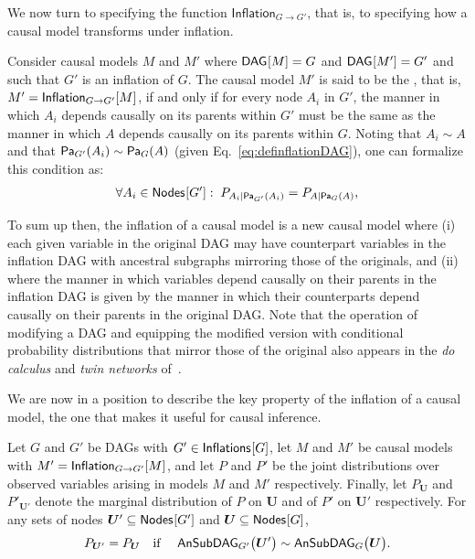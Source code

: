 We now turn to specifying the function $\mathsf{Inflation}_{G\to G'}$, that is, to specifying how a causal model transforms under inflation. 

\begin{definition}
Consider causal models $M$ and $M'$ where $\SmallNamedFunction{DAG}{M}=G$ and $\SmallNamedFunction{DAG}{M'}=G'$ and such that $G'$ is an inflation of $G$.   The causal model $M'$ is said to be the {\em {}}, that is, $M' = \SmallNamedFunction[G\to G']{Inflation}{M}$,  if and only if for every node $A_i$ in $G'$, the manner in which $A_i$ depends causally on its parents within $G'$ must be the same as the manner in which $A$ depends causally on its parents within $G$.  Noting that $A_i \sim A$ and that $\Pa[G']{A_i} \sim \Pa[G]{A}$ (given Eq.~\eqref{eq:definflationDAG}), one can formalize this condition as:
\begin{align}\label{eq:funcdependences}
 \forall A_i \in \SmallNamedFunction{Nodes}{G'}:\; \pfunc{A_i| \Pa[G']{A_i}}=\pfunc{A|\Pa[G]{A}},
\end{align}
\end{definition}

To sum up then, the inflation of a causal model is a new causal model where (i) each given variable in the original DAG may have counterpart variables in the inflation DAG with ancestral subgraphs mirroring those of the originals, and (ii) where the manner in which variables depend causally on their parents in the inflation DAG is given by the manner in which their counterparts depend causally on their parents in the original DAG.   Note that the operation of modifying a DAG and equipping the modified version with conditional probability distributions that mirror those of the original also appears in the \emph{do calculus} and \emph{twin networks} of~\citet{pearl2009causality}.


We are now in a position to describe the key property of the inflation of a causal model, the one that makes it useful for causal inference. 

Let $G$ and $G'$ be DAGs with $G' \in \SmallNamedFunction{Inflations}{G}$, let $M$ and $M'$ be causal models with $M' = \SmallNamedFunction[G\to G']{Inflation}{M}$, and let $P$ and $P'$ be the joint distributions over observed variables arising in models $M$ and $M'$ respectively.  Finally, let $P_{\bm{U}}$ and $P'_{\bm{U}'}$ denote the marginal distribution of $P$ on $\bm{U}$ and of $P'$ on $\bm{U}'$ respectively. For any sets of nodes $\bm{U}' \subseteq \SmallNamedFunction{Nodes}{G'}$ and   $\bm{U} \subseteq \SmallNamedFunction{Nodes}{G}$,
\begin{align}\label{eq:coincidingdistrodef}
P_{\bm{U}'}=P_{\bm{U}} \quad\text{if }\quad \ansubgraph[G']{\bm{U}'}\sim\ansubgraph[G]{\bm{U}}.%
\end{align}

